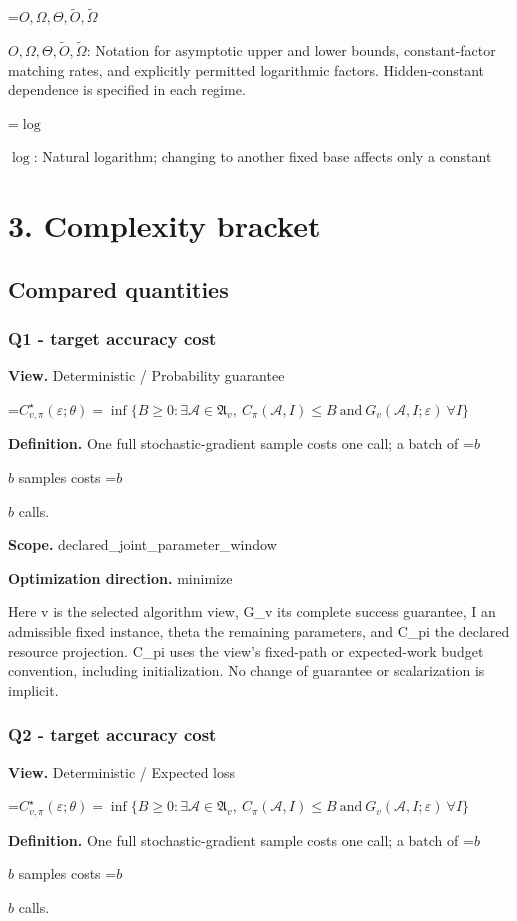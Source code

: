 \documentclass[10pt,a4paper]{article}
\newcommand{\AtlasMath}[1]{\par\begingroup\centering\setbox0=\hbox{$\displaystyle #1$}\ifdim\wd0>1.4\linewidth\typeout{ATLAS WIDE FORMULA: \the\wd0}\fi\ifdim\wd0>\linewidth\resizebox{\linewidth}{!}{\box0}\else\box0\fi\par\endgroup}
\newcommand{\AtlasInlineMath}[1]{\begingroup\setbox0=\hbox{$#1$}\ifdim\wd0>.4\linewidth\endgroup\AtlasMath{#1}\else\endgroup$#1$\fi}
\begin{document}
\AtlasInlineMath{O,\Omega,\Theta,\widetilde{O},\widetilde\Omega}: Notation for asymptotic upper and lower bounds, constant-factor matching rates, and explicitly permitted logarithmic factors. Hidden-constant dependence is specified in each regime.

\AtlasInlineMath{\log}: Natural logarithm; changing to another fixed base affects only a constant

\section{3. Complexity bracket}
\subsection{Compared quantities}
\subsubsection{Q1 - target accuracy cost}
\textbf{View.} Deterministic / Probability guarantee

\AtlasMath{C^\star_{v,\pi}(\varepsilon;\theta)=\inf\{B\ge0:\exists\mathcal A\in\mathfrak A_v,\ C_\pi(\mathcal A,I)\le B\ \text{and}\ G_v(\mathcal A,I;\varepsilon)\ \forall I\}}
\textbf{Definition.} One full stochastic-gradient sample costs one call; a batch of \AtlasInlineMath{b} samples costs \AtlasInlineMath{b} calls.

\textbf{Scope.} declared\_joint\_parameter\_window

\textbf{Optimization direction.} minimize

Here v is the selected algorithm view, G\_v its complete success guarantee, I an admissible fixed instance, theta the remaining parameters, and C\_pi the declared resource projection. C\_pi uses the view's fixed-path or expected-work budget convention, including initialization. No change of guarantee or scalarization is implicit.

\subsubsection{Q2 - target accuracy cost}
\textbf{View.} Deterministic / Expected loss

\AtlasMath{C^\star_{v,\pi}(\varepsilon;\theta)=\inf\{B\ge0:\exists\mathcal A\in\mathfrak A_v,\ C_\pi(\mathcal A,I)\le B\ \text{and}\ G_v(\mathcal A,I;\varepsilon)\ \forall I\}}
\textbf{Definition.} One full stochastic-gradient sample costs one call; a batch of \AtlasInlineMath{b} samples costs \AtlasInlineMath{b} calls.
\end{document}
